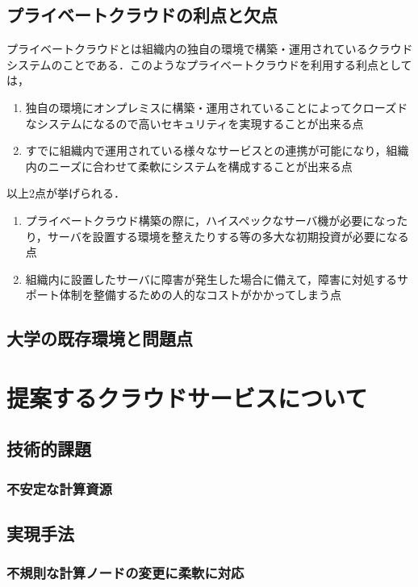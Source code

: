 \subsection{プライベートクラウドの利点と欠点}
プライベートクラウドとは組織内の独自の環境で構築・運用されているクラウドシステムのことである．このようなプライベートクラウドを利用する利点としては，
\begin{enumerate}
	\item 独自の環境にオンプレミスに構築・運用されていることによってクローズドなシステムになるので高いセキュリティを実現することが出来る点
	\item すでに組織内で運用されている様々なサービスとの連携が可能になり，組織内のニーズに合わせて柔軟にシステムを構成することが出来る点
\end{enumerate}
以上2点が挙げられる．\\
\begin{enumerate}
	\item プライベートクラウド構築の際に，ハイスペックなサーバ機が必要になったり，サーバを設置する環境を整えたりする等の多大な初期投資が必要になる点
	\item 組織内に設置したサーバに障害が発生した場合に備えて，障害に対処するサポート体制を整備するための人的なコストがかかってしまう点
\end{enumerate}

\subsection{大学の既存環境と問題点}


\section{提案するクラウドサービスについて}
\subsection{技術的課題}
\subsubsection{不安定な計算資源}
\subsection{実現手法}
\subsubsection{不規則な計算ノードの変更に柔軟に対応}

